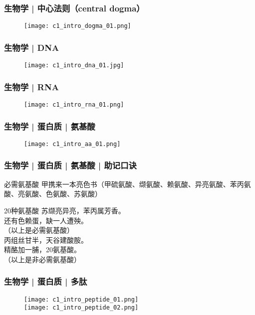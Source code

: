 \begin{frame}
  \frametitle{生物学 | 中心法则（central dogma）}
  \begin{figure}
    \centering
    \texttt{[image: c1\_intro\_dogma\_01.png]}
  \end{figure}
\end{frame}

\begin{frame}
  \frametitle{生物学 | \alert{DNA}}
  \begin{figure}
    \centering
    \texttt{[image: c1\_intro\_dna\_01.jpg]}
  \end{figure}
\end{frame}

\begin{frame}
  \frametitle{生物学 | \alert{RNA}}
  \begin{figure}
    \centering
    \texttt{[image: c1\_intro\_rna\_01.png]}
  \end{figure}
\end{frame}

\begin{frame}
  \frametitle{生物学 | 蛋白质 | \alert{氨基酸}}
  \begin{figure}
    \centering
    \texttt{[image: c1\_intro\_aa\_01.png]}
  \end{figure}
\end{frame}

\begin{frame}
  \frametitle{生物学 | 蛋白质 | 氨基酸 | 助记口诀}
  \begin{block}{必需氨基酸}
  甲携来一本亮色书（甲硫氨酸、缬氨酸、赖氨酸、异亮氨酸、苯丙氨酸、亮氨酸、色氨酸、苏氨酸）
\end{block}
\pause
\begin{block}{20种氨基酸}
  苏缬亮异亮，苯丙属芳香。\\
  还有色赖蛋，缺一人遭殃。\\
  （以上是必需氨基酸）\\
  丙组丝甘半，天谷建酸胺。\\
  精酪加一脯，20氨基酸。\\
  （以上是非必需氨基酸）
\end{block}
\end{frame}

\begin{frame}
  \frametitle{生物学 | 蛋白质 | 多肽}
  \begin{figure}
    \centering
    \texttt{[image: c1\_intro\_peptide\_01.png]}\\
    \texttt{[image: c1\_intro\_peptide\_02.png]}
  \end{figure}
\end{frame}

